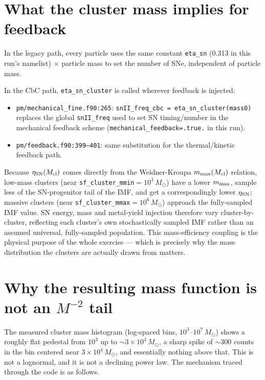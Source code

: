 \documentclass[11pt]{article}
\newcommand{\code}[1]{\texttt{#1}}
\begin{document}
\section{What the cluster mass implies for feedback}

In the legacy path, every particle uses the same constant
\code{eta\_sn} (0.313 in this run's namelist) $\times$ particle mass to set
the number of SNe, independent of particle mass.

In the CbC path, \code{eta\_sn\_cluster} is called wherever feedback is
injected:
\begin{itemize}
  \item \code{pm/mechanical\_fine.f90:265}: \code{snII\_freq\_cbc =
        eta\_sn\_cluster(mass0)} replaces the global \code{snII\_freq} used
        to set SN timing/number in the mechanical feedback scheme
        (\code{mechanical\_feedback=.true.} in this run).
  \item \code{pm/feedback.f90:399--401}: same substitution for the
        thermal/kinetic feedback path.
\end{itemize}

Because $\eta_{\rm SN}(M_{\rm cl})$ comes directly from the Weidner-Kroupa
$m_{\rm max}(M_{\rm cl})$ relation, low-mass clusters (near
\code{sf\_cluster\_mmin}$=10^3\,M_\odot$) have a lower $m_{\rm max}$, sample
less of the SN-progenitor tail of the IMF, and get a correspondingly lower
$\eta_{\rm SN}$; massive clusters (near
\code{sf\_cluster\_mmax}$=10^6\,M_\odot$) approach the fully-sampled IMF
value. SN energy, mass and metal-yield injection therefore vary
cluster-by-cluster, reflecting each cluster's own stochastically sampled
IMF rather than an assumed universal, fully-sampled population. This
mass-efficiency coupling is the physical purpose of the whole exercise ---
which is precisely why the mass distribution the clusters are actually
drawn from matters.

\section{Why the resulting mass function is not an $M^{-2}$ tail}

The measured cluster mass histogram (log-spaced bins, $10^3$--$10^7\,M_\odot$)
shows a roughly flat pedestal from $10^3$ up to $\sim\!3\times10^4\,M_\odot$,
a sharp spike of $\sim\!300$ counts in the bin centered near
$3\times10^4\,M_\odot$, and essentially nothing above that. This is not a
lognormal, and it is not a declining power law. The mechanism traced
through the code is as follows.
\end{document}
